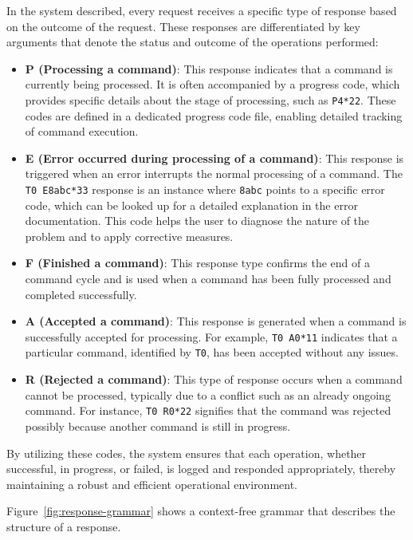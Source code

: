 In the system described, every request receives a specific type of response based on the outcome of the request. These responses are differentiated by key arguments that denote the status and outcome of the operations performed:

\begin{itemize}
    \item \textbf{P (Processing a command)}: This response indicates that a command is currently being processed. It is often accompanied by a progress code, which provides specific details about the stage of processing, such as \texttt{P4*22}. These codes are defined in a dedicated progress code file, enabling detailed tracking of command execution.
    \item \textbf{E (Error occurred during processing of a command)}: This response is triggered when an error interrupts the normal processing of a command. The \texttt{T0 E8abc*33} response is an instance where \texttt{8abc} points to a specific error code, which can be looked up for a detailed explanation in the error documentation. This code helps the user to diagnose the nature of the problem and to apply corrective measures.
    \item \textbf{F (Finished a command)}: This response type confirms the end of a command cycle and is used when a command has been fully processed and completed successfully.
    \item \textbf{A (Accepted a command)}: This response is generated when a command is successfully accepted for processing. For example, \texttt{T0 A0*11} indicates that a particular command, identified by \texttt{T0}, has been accepted without any issues.
    \item \textbf{R (Rejected a command)}: This type of response occurs when a command cannot be processed, typically due to a conflict such as an already ongoing command. For instance, \texttt{T0 R0*22} signifies that the command was rejected possibly because another command is still in progress.

\end{itemize}

By utilizing these codes, the system ensures that each operation, whether successful, in progress, or failed, is logged and responded appropriately, thereby maintaining a robust and efficient operational environment.

Figure~\ref{fig:response-grammar} shows a context-free grammar that describes the structure of a response.

